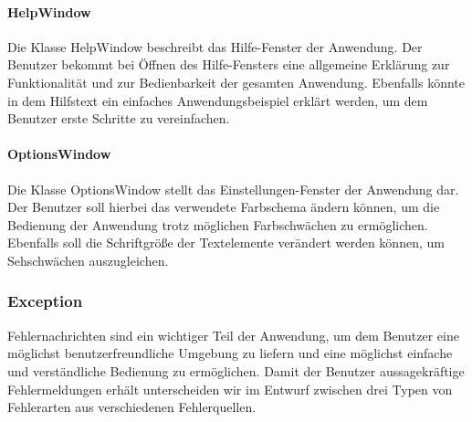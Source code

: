\documentclass[parskip=full]{scrartcl}
\begin{document}
\paragraph{HelpWindow}

Die Klasse HelpWindow beschreibt das Hilfe-Fenster der Anwendung. Der Benutzer bekommt bei Öffnen des Hilfe-Fensters eine allgemeine Erklärung zur Funktionalität und zur Bedienbarkeit der gesamten Anwendung. Ebenfalls könnte in dem Hilfstext ein einfaches Anwendungsbeispiel erklärt werden, um dem Benutzer erste Schritte zu vereinfachen.

\paragraph{OptionsWindow}

Die Klasse OptionsWindow stellt das Einstellungen-Fenster der Anwendung dar. Der Benutzer soll hierbei das verwendete Farbschema ändern können, um die Bedienung der Anwendung trotz möglichen Farbschwächen zu ermöglichen. Ebenfalls soll die Schriftgröße der Textelemente verändert werden können, um Sehschwächen auszugleichen. 

\newpage

\subsubsection{Exception}

Fehlernachrichten sind ein wichtiger Teil der Anwendung, um dem Benutzer eine möglichst benutzerfreundliche Umgebung zu liefern und eine möglichst einfache und verständliche Bedienung zu ermöglichen. Damit der Benutzer aussagekräftige Fehlermeldungen erhält unterscheiden wir im Entwurf zwischen drei Typen von Fehlerarten aus verschiedenen Fehlerquellen.
\end{document}
